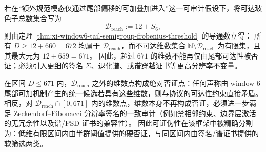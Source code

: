 \begin{corollary}\label{cor:xi-window6-dimension-sieve-finite}
若在“额外规范模态仅通过尾部偏移的可加叠加进入”这一可审计假设下，将可达玻色子总数集合写为
\[
\mathcal D_{\mathrm{reach}}:=12+S_6,
\]
则由定理 \ref{thm:xi-window6-tail-semigroup-frobenius-threshold} 的导通数立得：
所有 \(D\ge 12+660=672\) 均属于 \(\mathcal D_{\mathrm{reach}}\)，而不可达维数集合 \(\mathbb N\setminus\mathcal D_{\mathrm{reach}}\) 为有限集，且其最大元为 \(12+659=671\)。
因此，超过 \(671\) 的维数不能再仅由尾部可达性被否证；必须引入更细的签名 \(\Sigma\)、退化谱、或谱穿越证书等更高分辨率不变量。
\end{corollary}

\begin{proposition}\label{prop:xi-window6-falsifiability-layering-from-semigroup}
在区间 \(D\le 671\) 内，\(\mathcal D_{\mathrm{reach}}\) 之外的维数点构成绝对否证点：任何声称由 window-\(6\) 尾部可加机制产生的统一候选若具有这些维数，则与协议的可达性约束直接矛盾。
相反，对 \(\mathcal D_{\mathrm{reach}}\cap[0,671]\) 内的维数点，维数本身不再构成否证，必须进一步满足 Zeckendorf--Fibonacci 分辨率签名的一致审计（例如禁相邻约束、边界层激活的无冗余性以及谱/PSD 证书的兼容性）。
因此可证伪性在该框架中被精确分割为：低维有限区间内由半群阈值提供的硬否证，与同区间内由签名/谱证书提供的软筛选两类。
\end{proposition}
